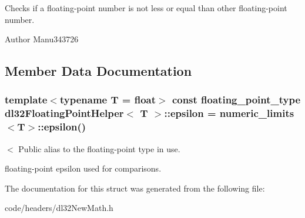 Checks if a floating-\/point number is not less or equal than other floating-\/point number. 

\begin{DoxyAuthor}{Author}
Manu343726 
\end{DoxyAuthor}


\subsection{Member Data Documentation}
\hypertarget{structdl32_floating_point_helper_a90f2525eb7cd225454fc3854b54fc71c}{
\subsubsection[{epsilon}]{\setlength{\rightskip}{0pt plus 5cm}template$<$typename T  = float$>$ const floating\-\_\-point\-\_\-type {\bf dl32\-Floating\-Point\-Helper}$<$ T $>$\-::epsilon = numeric\-\_\-limits$<$T$>$\-::epsilon()\hspace{0.3cm}{\ttfamily [static]}}}\label{structdl32_floating_point_helper_a90f2525eb7cd225454fc3854b54fc71c}


$<$ Public alias to the floating-\/point type in use. 

floating-\/point epsilon used for comparisons. 

The documentation for this struct was generated from the following file\-:\begin{DoxyCompactItemize}
\item 
code/headers/dl32\-New\-Math.\-h\end{DoxyCompactItemize}
